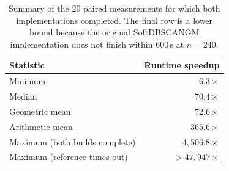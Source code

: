 \documentclass[twoside,11pt]{article}
\begin{document}
\begin{table}[h!]
\centering
\caption{Summary of the 20 paired measurements for which both implementations
completed. The final row is a lower bound because the original
SoftDBSCANGM implementation does not finish within $600$\,s at $n=240$.}
\label{tab:opt-summary}
\setlength{\tabcolsep}{10pt}
\renewcommand{\arraystretch}{1.15}
\small
\begin{tabular}{lr}
\toprule
\textbf{Statistic} & \textbf{Runtime speedup} \\
\midrule
Minimum & $6.3\times$ \\
Median & $\mathbf{70.4\times}$ \\
Geometric mean & $\mathbf{72.6\times}$ \\
Arithmetic mean & $365.6\times$ \\
Maximum (both builds complete) & $4{,}506.8\times$ \\
Maximum (reference times out) & $>47{,}947\times$ \\
\bottomrule
\end{tabular}
\end{table}
\end{document}
